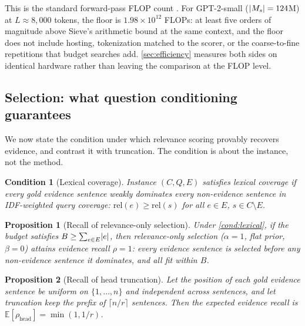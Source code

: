 \documentclass[review,12pt]{elsarticle}
\DeclarePairedDelimiter\abs{\lvert}{\rvert}
\newtheorem{proposition}{Proposition}
\newtheorem{condition}{Condition}
\theoremstyle{remark}
\newcommand{\method}{Sieve}
\begin{document}
This is the standard forward-pass FLOP count \citep{kaplan2020scaling}.
For GPT-2-small ($\abs{M_s} = 124$M) at $L \approx 8{,}000$ tokens,
the floor is $1.98 \times 10^{12}$ FLOPs: at least five orders of
magnitude above \method{}'s arithmetic bound at the same context, and
the floor does not include hosting, tokenization matched to the
scorer, or the coarse-to-fine repetitions that budget searches add.
\autoref{sec:efficiency} measures both sides on identical hardware
rather than leaving the comparison at the FLOP level.

\subsection{Selection: what question conditioning guarantees}
\label{sec:guarantees}
We now state the condition under which relevance scoring provably
recovers evidence, and contrast it with truncation. The condition is
about the instance, not the method.

\begin{condition}[Lexical coverage]
\label{cond:lexical}
Instance $(C, Q, E)$ satisfies lexical coverage if every gold
evidence sentence weakly dominates every non-evidence sentence in
IDF-weighted query coverage:
$\mathrm{rel}(e) \ge \mathrm{rel}(s)$ for all $e \in E$,
$s \in C \setminus E$.
\end{condition}

\begin{proposition}[Recall of relevance-only selection]
\label{prop:relonly}
Under \autoref{cond:lexical}, if the budget satisfies
$B \ge \sum_{e \in E} \abs{e}$, then relevance-only selection
($\alpha=1$, flat prior, $\beta=0$) attains evidence recall $\rho=1$:
every evidence sentence is selected before any non-evidence sentence
it dominates, and all fit within $B$.
\end{proposition}

\begin{proposition}[Recall of head truncation]
\label{prop:head}
Let the position of each gold evidence sentence be uniform on
$\{1, \ldots, n\}$ and independent across sentences, and let
truncation keep the prefix of $\lceil n/r \rceil$ sentences. Then the
expected evidence recall is
$\mathbb{E}[\rho_{\mathrm{head}}] = \min(1, 1/r)$.
\end{proposition}
\end{document}
